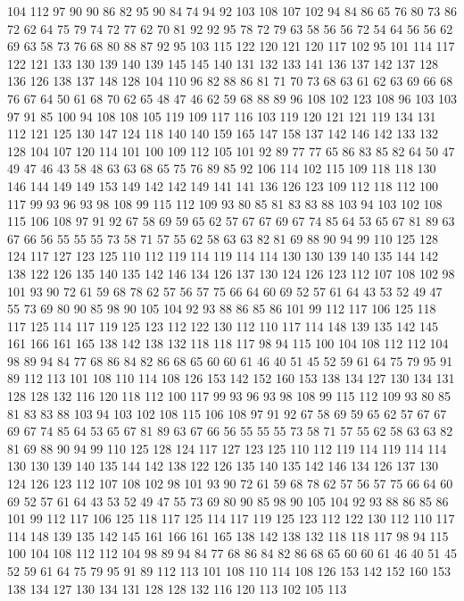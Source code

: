104 112 97 90 90 86 82 95 90 84 74 94 92 103 108 107 102 94 84 86
65 76 80 73 86 72 62 64 75 79 74 72 77 62 70 81 92 92 95 78
72 79 63 58 56 56 72 54 64 56 56 62 69 63 58 73 76 68 80 88
87 92 95 103 115 122 120 121 120 117 102 95 101 114 117 122 121 133 130 139
140 139 145 145 140 131 132 133 141 136 137 142 137 128 136 126 138 137 148 128
104 110 96 82 88 86 81 71 70 73 68 63 61 62 63 69 66 68 76 67
64 50 61 68 70 62 65 48 47 46 62 59 68 88 89 96 108 102 123 108
96 103 103 97 91 85 100 94 108 108 105 119 109 117 116 103 119 120 121 121
119 134 131 112 121 125 130 147 124 118 140 140 159 165 147 158 137 142 146 142
133 132 128 104 107 120 114 101 100 109 112 105 101 92 89 77 77 65 86 83
85 82 64 50 47 49 47 46 43 58 48 63 63 68 65 75 76 89 85 92
106 114 102 115 109 118 118 130 146 144 149 149 153 149 142 142 149 141 141 136
126 123 109 112 118 112 100 117 99 93 96 93 98 108 99 115 112 109 93 80
85 81 83 83 88 103 94 103 102 108 115 106 108 97 91 92 67 58 69 59
65 62 57 67 67 69 67 74 85 64 53 65 67 81 89 63 67 66 56 55
55 55 73 58 71 57 55 62 58 63 63 82 81 69 88 90 94 99 110 125
128 124 117 127 123 125 110 112 119 114 119 114 114 130 130 139 140 135 144 142
138 122 126 135 140 135 142 146 134 126 137 130 124 126 123 112 107 108 102 98
101 93 90 72 61 59 68 78 62 57 56 57 75 66 64 60 69 52 57 61
64 43 53 52 49 47 55 73 69 80 90 85 98 90 105 104 92 93 88 86
85 86 101 99 112 117 106 125 118 117 125 114 117 119 125 123 112 122 130 112
110 117 114 148 139 135 142 145 161 166 161 165 138 142 138 132 118 118 117 98
94 115 100 104 108 112 112 104 98 89 94 84 77 68 86 84 82 86 68 65
60 60 61 46 40 51 45 52 59 61 64 75 79 95 91 89 112 113 101 108
110 114 108 126 153 142 152 160 153 138 134 127 130 134 131 128 128 132 116 120
118 112 100 117 99 93 96 93 98 108 99 115 112 109 93 80 85 81 83 83
88 103 94 103 102 108 115 106 108 97 91 92 67 58 69 59 65 62 57 67
67 69 67 74 85 64 53 65 67 81 89 63 67 66 56 55 55 55 73 58
71 57 55 62 58 63 63 82 81 69 88 90 94 99 110 125 128 124 117 127
123 125 110 112 119 114 119 114 114 130 130 139 140 135 144 142 138 122 126 135
140 135 142 146 134 126 137 130 124 126 123 112 107 108 102 98 101 93 90 72
61 59 68 78 62 57 56 57 75 66 64 60 69 52 57 61 64 43 53 52
49 47 55 73 69 80 90 85 98 90 105 104 92 93 88 86 85 86 101 99
112 117 106 125 118 117 125 114 117 119 125 123 112 122 130 112 110 117 114 148
139 135 142 145 161 166 161 165 138 142 138 132 118 118 117 98 94 115 100 104
108 112 112 104 98 89 94 84 77 68 86 84 82 86 68 65 60 60 61 46
40 51 45 52 59 61 64 75 79 95 91 89 112 113 101 108 110 114 108 126
153 142 152 160 153 138 134 127 130 134 131 128 128 132 116 120 113 102 105 113
